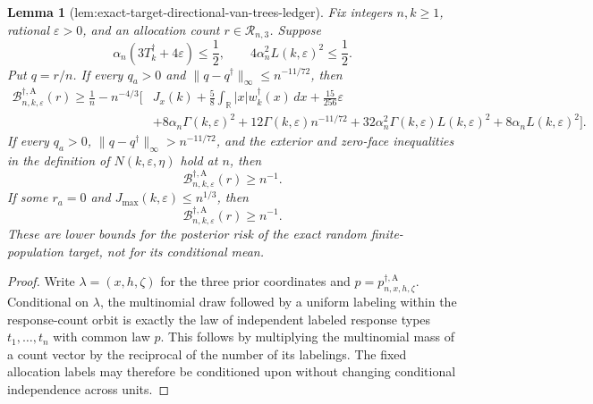 \documentclass{article}
\newtheorem{lemma}{Lemma}
\begin{document}
{\begin{lemma}[lem:exact-target-directional-van-trees-ledger]\label{lem:exact-target-directional-van-trees-ledger}
Fix integers \(n,k\ge1\), rational \(\varepsilon>0\), and an allocation count
\(r\in\mathcal R_{n,3}\).  Suppose
\[
\alpha_n(3T_k^\dagger+4\varepsilon)\le\frac12,
\qquad
4\alpha_n^2L(k,\varepsilon)^2\le\frac12.
\]
Put \(q=r/n\).  If every \(q_a>0\) and
\(\|q-q^\dagger\|_\infty\le n^{-11/72}\), then
\[
\begin{aligned}
\mathcal B_{n,k,\varepsilon}^{\dagger,\mathrm A}(r)
\ge\frac1n-n^{-4/3}\Bigg[&J_x(k)+\frac58
\int_{\mathbb R}|x|w_k^\dagger(x)\,dx+\frac{15}{256}\varepsilon\\
&+8\alpha_n\Gamma(k,\varepsilon)^2
+12\Gamma(k,\varepsilon)n^{-11/72}
+32\alpha_n^2\Gamma(k,\varepsilon)L(k,\varepsilon)^2
+8\alpha_nL(k,\varepsilon)^2\Bigg].
\end{aligned}
\tag{L}
\]
If every \(q_a>0\), \(\|q-q^\dagger\|_\infty>n^{-11/72}\), and the exterior and zero-face inequalities in the definition of
\(N(k,\varepsilon,\eta)\) hold at \(n\), then
\[
\mathcal B_{n,k,\varepsilon}^{\dagger,\mathrm A}(r)\ge n^{-1}.
\tag{X}
\]
If some \(r_a=0\) and
\(J_{\max}(k,\varepsilon)\le n^{1/3}\), then
\[
\mathcal B_{n,k,\varepsilon}^{\dagger,\mathrm A}(r)\ge n^{-1}.
\tag{Z}
\]
These are lower bounds for the posterior risk of the exact random finite-population target, not for its conditional mean.
\end{lemma}
\begin{proof}
Write \(\lambda=(x,h,\zeta)\) for the three prior coordinates and
\(p=p_{n,x,h,\zeta}^{\dagger,\mathrm A}\).  Conditional on \(\lambda\), the multinomial draw followed by a uniform labeling within the response-count orbit is exactly the law of independent labeled response types \(t_1,\ldots,t_n\) with common law \(p\).  This follows by multiplying the multinomial mass of a count vector by the reciprocal of the number of its labelings.  The fixed allocation labels may therefore be conditioned upon without changing conditional independence across units.


\end{proof}}
\end{document}
